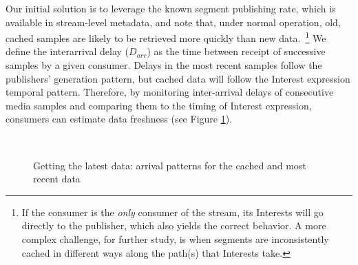 \documentclass{icn/sig-alternate-2012} %
\begin{document}
Our initial solution is to leverage the known segment publishing rate, which is available in stream-level metadata, and note that, under normal operation, old, cached samples are likely to be retrieved more quickly than new data.~\footnote{If the consumer is the \emph{only} consumer of the stream, its Interests will go directly to the publisher, which also yields the correct behavior. A more complex challenge, for further study, is when segments are inconsistently cached in different ways along the path(s) that Interests take.} We define the interarrival delay ($D_{arr}$) as the time between receipt of successive samples by a given consumer. Delays in the most recent samples follow the publishers' generation pattern, but cached data will follow the Interest expression temporal pattern. Therefore, by monitoring inter-arrival delays of consecutive media samples and comparing them to the timing of Interest expression, consumers can estimate data freshness (see Figure \ref{fig:inter-arrival}).



\begin{figure}[t!]
\centering

\\

\caption{Getting the latest data: arrival patterns for the cached and most recent data}
\label{fig:inter-arrival}
\end{figure}
\end{document}
